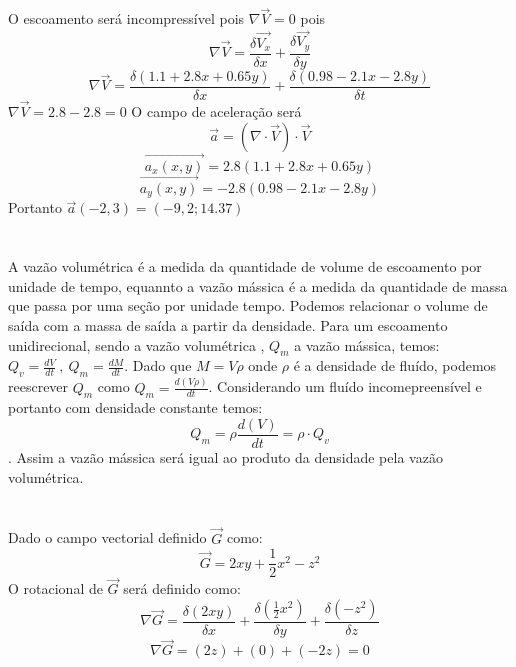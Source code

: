 \documentclass[a4paper,twocolumn,11pt]{article}
\begin{document}
\section{} %
O escoamento será incompressível pois $\nabla \vec{V} = 0$ pois
$$\nabla \vec{V} = \frac{\delta \vec{V_x}}{\delta x} + \frac{\delta \vec{V_y}}{\delta y}$$
$$\nabla \vec{V} = \frac{\delta (1.1+2.8x+0.65y)}{\delta x} + \frac{\delta (0.98 -2.1x - 2.8y)}{\delta t}$$
$\nabla \vec{V} = 2.8 - 2.8 = 0$
O campo de aceleração será
$$
\vec{a} = (\nabla\cdot\vec{V})\cdot\vec{V}
$$
$$
\vec{a_x(x,y)} = 2.8 (1.1+2.8x+0.65y)
$$
$$
\vec{a_y(x,y)} = -2.8 (0.98 -2.1x - 2.8y)
$$
Portanto  $\vec{a}(-2,3) = (-9,2;14.37)$
\section{} %
\section{} %
\section{} %
\section{} %
\section{} %
A vazão volumétrica é a medida da quantidade de volume de escoamento por unidade de tempo, equannto a vazão mássica é a medida da quantidade de massa que passa por uma seção por unidade tempo. Podemos relacionar o volume de saída com a massa de saída a partir da densidade. Para um escoamento unidirecional, sendo a vazão volumétrica , $Q_m$ a vazão mássica, temos:$Q_v = \frac{d V}{dt}\ ,\ Q_m = \frac{d M}{dt}$. Dado que $M = V \rho $ onde $\rho$ é a densidade de fluído, podemos reescrever $Q_m$ como $Q_m = \frac{d (V \rho)}{dt}$. Considerando um fluído incomepreensível e portanto com densidade constante temos:
$$Q_m = \rho \frac{d (V)}{dt} = \rho\cdot Q_v$$. Assim a vazão mássica será igual ao produto da densidade pela vazão volumétrica.
\section{} %
Dado o campo vectorial definido $\vec{G}$ como:
$$\vec{G} = 2xy + \frac{1}{2}x^2 - z^2$$
O rotacional de $\vec{G}$ será definido como:
$$\nabla \vec{G} = \frac{\delta (2xy)}{\delta x} + \frac{\delta \left(\frac{1}{2}x^2\right)}{\delta y} + \frac{\delta (-z^2)}{\delta z}$$
$$\nabla \vec{G} = (2z) + (0) + (-2z) = 0$$
\end{document}
